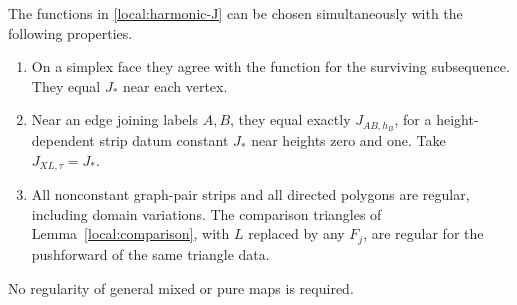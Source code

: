 \begin{proposition}\label{local:data}
The functions in \eqref{local:harmonic-J} can be chosen simultaneously
with the following properties.
\begin{enumerate}[label=(\roman*)]
\item On a simplex face they agree with the function for the surviving
subsequence.  They equal $J_*$ near each vertex.
\item Near an edge joining labels $A,B$, they equal exactly
$J_{AB,h_B}$, for a height-dependent strip datum constant $J_*$ near
heights zero and one.  Take $J_{XL,\tau}=J_*$.
\item All nonconstant graph-pair strips and all directed polygons are
regular, including domain variations.  The comparison triangles of
Lemma~\ref{local:comparison}, with $L$ replaced by any $F_j$, are regular
for the pushforward of the same triangle data.
\end{enumerate}
No regularity of general mixed or pure maps is required.
\end{proposition}
